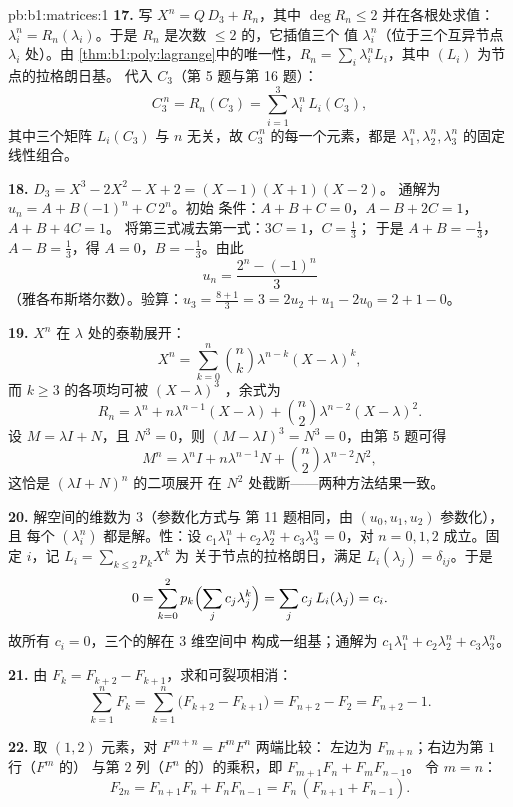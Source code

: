 \begin{solution}{pb:b1:matrices:1}
\textbf{17.} 写 $X^n = Q\,D_3 + R_n$，其中 $\deg R_n \leq 2$
并在各根处求值：$\lambda_i^n = R_n(\lambda_i)$。于是
$R_n$ 是次数 $\leq 2$ 的，它插值三个
值 $\lambda_i^n$（位于三个互异节点 $\lambda_i$ 处）。由
\cref{thm:b1:poly:lagrange}中的唯一性，$R_n = \sum_i
\lambda_i^n L_i$，其中 $(L_i)$ 为节点的拉格朗日基。
代入 $C_3$（第 5 题与第 16 题）：
\[
C_3^{\,n} = R_n(C_3) = \sum_{i=1}^{3} \lambda_i^n\,L_i(C_3),
\]
其中三个矩阵 $L_i(C_3)$ 与 $n$ 无关，故
$C_3^{\,n}$ 的每一个元素，都是 $\lambda_1^n,
\lambda_2^n, \lambda_3^n$ 的固定线性组合。

\textbf{18.} $D_3 = X^3 - 2X^2 - X + 2 = (X-1)(X+1)(X-2)$。
通解为 $u_n = A + B(-1)^n + C\,2^n$。初始
条件：$A + B + C = 0$，$A - B + 2C = 1$，$A + B + 4C = 1$。
将第三式减去第一式：$3C = 1$，$C = \frac13$；
于是 $A + B = -\frac13$，$A - B = \frac13$，得 $A = 0$，$B =
-\frac13$。由此
\[
u_n = \frac{2^n - (-1)^n}{3}
\]
（雅各布斯塔尔数）。验算：$u_3 = \frac{8 + 1}{3} = 3 =
2u_2 + u_1 - 2u_0 = 2 + 1 - 0$。

\textbf{19.}  $X^n$ 在
$\lambda$ 处的泰勒展开：
\[
X^n = \sum_{k=0}^{n} \binom nk \lambda^{n-k}(X - \lambda)^k ,
\]
而 $k \geq 3$ 的各项均可被 $(X -
\lambda)^3$ ，余式为
\[
R_n = \lambda^n + n\lambda^{n-1}(X - \lambda) + \binom
n2\lambda^{n-2}(X - \lambda)^2 .
\]
设 $M = \lambda I + N$，且 $N^3 = 0$，则 $(M - \lambda I)^3 = N^3
= 0$，由第 5 题可得
\[
M^n = \lambda^n I + n\lambda^{n-1} N + \binom n2
\lambda^{n-2} N^2 ,
\]
这恰是 $(\lambda I + N)^n$ 的二项展开
在 $N^2$ 处截断——两种方法结果一致。

\textbf{20.} 解空间的维数为 $3$（参数化方式与
第 11 题相同，由 $(u_0, u_1, u_2)$ 参数化），且
每个 $(\lambda_i^n)$ 都是解。性：设
$c_1\lambda_1^n + c_2\lambda_2^n + c_3\lambda_3^n = 0$，对 $n =
0, 1, 2$ 成立。固定 $i$，记 $L_i = \sum_{k \leq 2} p_k X^k$ 为
关于节点的拉格朗日，满足 $L_i(\lambda_j) =
\delta_{ij}$。于是
\[
0 = \sum_{k=0}^{2} p_k\Bigl(\sum_j c_j\lambda_j^k\Bigr)
= \sum_j c_j\,L_i(\lambda_j) = c_i .
\]
故所有 $c_i = 0$，三个的解在 $3$ 维空间中
构成一组基；通解为 $c_1\lambda_1^n +
c_2\lambda_2^n + c_3\lambda_3^n$。

\textbf{21.} 由 $F_k = F_{k+2} - F_{k+1}$，求和可裂项相消：
\[
\sum_{k=1}^{n} F_k = \sum_{k=1}^{n}\bigl(F_{k+2} - F_{k+1}\bigr)
= F_{n+2} - F_2 = F_{n+2} - 1 .
\]

\textbf{22.} 取 $(1,2)$ 元素，对 $F^{m+n} = F^m F^n$ 两端比较：
左边为 $F_{m+n}$；右边为第 $1$ 行（$F^m$ 的）
与第 $2$ 列（$F^n$ 的）的乘积，即 $F_{m+1}F_n + F_m F_{n-1}$。
令 $m = n$：
\[
F_{2n} = F_{n+1}F_n + F_nF_{n-1} = F_n\,(F_{n+1} + F_{n-1}).
\]


\end{solution}
